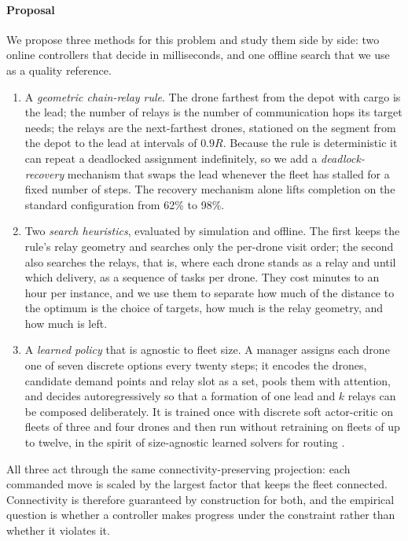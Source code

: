 \documentclass[final,5p,times,twocolumn]{elsarticle}
\begin{document}
\paragraph{Proposal}
We propose three methods for this problem and study them side by side: two online controllers
that decide in milliseconds, and one offline search that we use as a quality reference.
\begin{enumerate}
\item A \emph{geometric chain-relay rule}. The drone farthest from the depot with cargo is
the lead; the number of relays is the number of communication hops its target needs; the relays
are the next-farthest drones, stationed on the segment from the depot to the lead at intervals of
$0.9R$. Because the rule is deterministic it can repeat a deadlocked assignment indefinitely, so
we add a \emph{deadlock-recovery} mechanism that swaps the lead whenever the fleet has stalled for a
fixed number of steps. The recovery mechanism alone lifts completion on the standard configuration
from 62\% to 98\%.
\item Two \emph{search heuristics}, evaluated by simulation and offline. The first keeps the
rule's relay geometry and searches only the per-drone visit order; the second also searches the
relays, that is, where each drone stands as a relay and until which delivery, as a sequence of
tasks per drone. They cost minutes to an hour per instance, and we use them to separate how
much of the distance to the optimum is the choice of targets, how much is the relay geometry,
and how much is left.
\item A \emph{learned policy} that is agnostic to fleet size. A manager assigns each drone one of
seven discrete options every twenty steps; it encodes the drones, candidate demand points and relay
slot as a set, pools them with attention, and decides autoregressively so that a formation of one
lead and $k$ relays can be composed deliberately. It is trained once with discrete soft
actor-critic \cite{haarnoja2018} on fleets of three and four drones and then run without
retraining on fleets of up to twelve, in the spirit of size-agnostic learned solvers for routing
\cite{kool2019,park2023}.
\end{enumerate}
All three act through the same connectivity-preserving projection: each commanded move is
scaled by the largest factor that keeps the fleet connected. Connectivity is therefore guaranteed
by construction for both, and the empirical question is whether a controller makes progress under
the constraint rather than whether it violates it.
\end{document}
